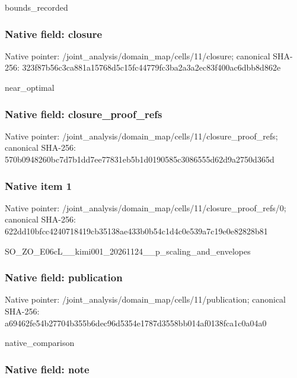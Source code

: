\documentclass[10pt,a4paper]{article}
\begin{document}
bounds\_recorded


\subsubsection{Native field: closure}


Native pointer: /joint\_analysis/domain\_m\allowbreak{}ap/cells/11/closure; canonical SHA-256: 323f87b56c3ca881a15768d5\allowbreak{}c15fc44779fc3ba2a3a2ec83\allowbreak{}f400ac6dbb8d862e


near\_optimal


\subsubsection{Native field: closure\_proof\_refs}


Native pointer: /joint\_analysis/domain\_m\allowbreak{}ap/cells/11/closure\_proo\allowbreak{}f\_refs; canonical SHA-256: 570b0948260bc7d7b1dd7ee7\allowbreak{}7831eb5b1d0190585c308655\allowbreak{}5d62d9a2750d365d



\subsubsection{Native item 1}


Native pointer: /joint\_analysis/domain\_m\allowbreak{}ap/cells/11/closure\_proo\allowbreak{}f\_refs/0; canonical SHA-256: 622dd10bfcc4240718419cb3\allowbreak{}5138ae433b0b54c1d4c0e539\allowbreak{}a7c19e0e82828b81


SO\_ZO\_E06cL\_\_kimi001\_202\allowbreak{}61124\_\_p\_scaling\_and\_env\allowbreak{}elopes


\subsubsection{Native field: publication}


Native pointer: /joint\_analysis/domain\_m\allowbreak{}ap/cells/11/publication; canonical SHA-256: a69462fe54b27704b355b6de\allowbreak{}c96d5354e1787d3558bb014a\allowbreak{}f0138fca1c0a04a0


native\_comparison


\subsubsection{Native field: note}
\end{document}

